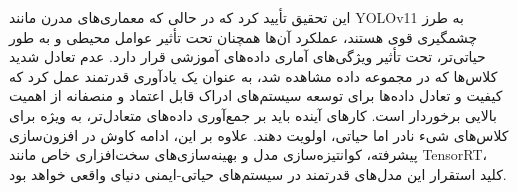 \documentclass[oneside]{report}
\begin{document}
این تحقیق تأیید کرد که در حالی که معماری‌های مدرن مانند YOLOv11 به طرز چشمگیری قوی هستند، عملکرد آن‌ها همچنان تحت تأثیر عوامل محیطی و به طور حیاتی‌تر، تحت تأثیر ویژگی‌های آماری داده‌های آموزشی قرار دارد. عدم تعادل شدید کلاس‌ها که در مجموعه داده مشاهده شد، به عنوان یک یادآوری قدرتمند عمل کرد که کیفیت و تعادل داده‌ها برای توسعه سیستم‌های ادراک قابل اعتماد و منصفانه از اهمیت بالایی برخوردار است. کارهای آینده باید بر جمع‌آوری داده‌های متعادل‌تر، به ویژه برای کلاس‌های شیء نادر اما حیاتی، اولویت دهند. علاوه بر این، ادامه کاوش در افزون‌سازی پیشرفته، کوانتیزه‌سازی مدل و بهینه‌سازی‌های سخت‌افزاری خاص مانند TensorRT، کلید استقرار این مدل‌های قدرتمند در سیستم‌های حیاتی-ایمنی دنیای واقعی خواهد بود.

% 
%   
\end{document}

